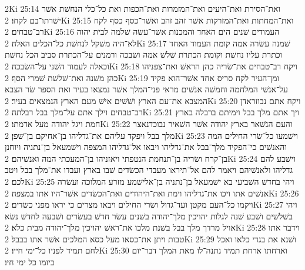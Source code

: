 2Ki 25:14  ואת־הסירת ואת־היעים ואת־המזמרות ואת־הכפות ואת כל־כלי הנחשׁת אשׁר ישׁרתו־בם לקחו׃
2Ki 25:15  ואת־המחתות ואת־המזרקות אשׁר זהב זהב ואשׁר־כסף כסף לקח רב־טבחים׃
2Ki 25:16  העמודים שׁנים הים האחד והמכנות אשׁר־עשׂה שׁלמה לבית יהוה לא־היה משׁקל לנחשׁת כל־הכלים האלה׃
2Ki 25:17  שׁמנה עשׂרה אמה קומת העמוד האחד וכתרת עליו נחשׁת וקומת הכתרת שׁלשׁ אמה ושׂבכה ורמנים על־הכתרת סביב הכל נחשׁת וכאלה לעמוד השׁני על־השׂבכה׃
2Ki 25:18  ויקח רב־טבחים את־שׂריה כהן הראשׁ ואת־צפניהו כהן משׁנה ואת־שׁלשׁת שׁמרי הסף׃
2Ki 25:19  ומן־העיר לקח סריס אחד אשׁר־הוא פקיד על־אנשׁי המלחמה וחמשׁה אנשׁים מראי פני־המלך אשׁר נמצאו בעיר ואת הספר שׂר הצבא המצבא את־עם הארץ ושׁשׁים אישׁ מעם הארץ הנמצאים בעיר׃
2Ki 25:20  ויקח אתם נבוזראדן רב־טבחים וילך אתם על־מלך בבל רבלתה׃
2Ki 25:21  ויך אתם מלך בבל וימיתם ברבלה בארץ חמת ויגל יהודה מעל אדמתו׃
2Ki 25:22  והעם הנשׁאר בארץ יהודה אשׁר השׁאיר נבוכדנאצר מלך בבל ויפקד עליהם את־גדליהו בן־אחיקם בן־שׁפן׃
2Ki 25:23  וישׁמעו כל־שׂרי החילים המה והאנשׁים כי־הפקיד מלך־בבל את־גדליהו ויבאו אל־גדליהו המצפה וישׁמעאל בן־נתניה ויוחנן בן־קרח ושׂריה בן־תנחמת הנטפתי ויאזניהו בן־המעכתי המה ואנשׁיהם׃
2Ki 25:24  וישׁבע להם גדליהו ולאנשׁיהם ויאמר להם אל־תיראו מעבדי הכשׂדים שׁבו בארץ ועבדו את־מלך בבל ויטב לכם׃
2Ki 25:25  ויהי בחדשׁ השׁביעי בא ישׁמעאל בן־נתניה בן־אלישׁמע מזרע המלוכה ועשׂרה אנשׁים אתו ויכו את־גדליהו וימת ואת־היהודים ואת־הכשׂדים אשׁר־היו אתו במצפה׃
2Ki 25:26  ויקמו כל־העם מקטן ועד־גדול ושׂרי החילים ויבאו מצרים כי יראו מפני כשׂדים׃
2Ki 25:27  ויהי בשׁלשׁים ושׁבע שׁנה לגלות יהויכין מלך־יהודה בשׁנים עשׂר חדשׁ בעשׂרים ושׁבעה לחדשׁ נשׂא אויל מרדך מלך בבל בשׁנת מלכו את־ראשׁ יהויכין מלך־יהודה מבית כלא׃
2Ki 25:28  וידבר אתו טבות ויתן את־כסאו מעל כסא המלכים אשׁר אתו בבבל׃
2Ki 25:29  ושׁנא את בגדי כלאו ואכל לחם תמיד לפניו כל־ימי חייו׃
2Ki 25:30  וארחתו ארחת תמיד נתנה־לו מאת המלך דבר־יום ביומו כל ימי חיו׃


